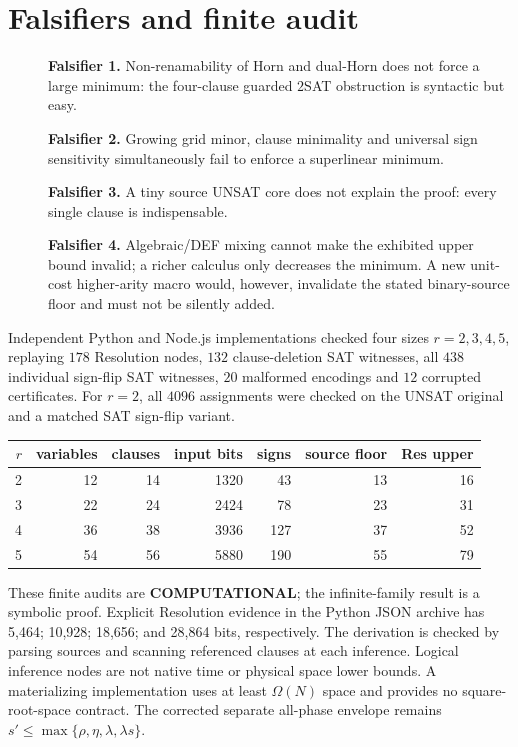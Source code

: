 \documentclass[11pt]{article}
\begin{document}
\section*{Falsifiers and finite audit}
\begin{description}
\item[] \textbf{Falsifier 1.} Non-renamability of Horn and dual-Horn does not force a large minimum: the four-clause guarded $2$SAT obstruction is syntactic but easy.
\item[] \textbf{Falsifier 2.} Growing grid minor, clause minimality and universal sign sensitivity simultaneously fail to enforce a superlinear minimum.
\item[] \textbf{Falsifier 3.} A tiny source UNSAT core does not explain the proof: every single clause is indispensable.
\item[] \textbf{Falsifier 4.} Algebraic/DEF mixing cannot make the exhibited upper bound invalid; a richer calculus only decreases the minimum. A new unit-cost higher-arity macro would, however, invalidate the stated binary-source floor and must not be silently added.
\end{description}
Independent Python and Node.js implementations checked four sizes $r=2,3,4,5$, replaying $178$ Resolution nodes, $132$ clause-deletion SAT witnesses, all $438$ individual sign-flip SAT witnesses, $20$ malformed encodings and $12$ corrupted certificates. For $r=2$, all $4096$ assignments were checked on the UNSAT original and a matched SAT sign-flip variant.

\begin{center}
\begin{tabular}{rrrrrrr}\toprule
$r$&variables&clauses&input bits&signs&source floor&Res upper\\\midrule
2&12&14&1320&43&13&16\\
3&22&24&2424&78&23&31\\
4&36&38&3936&127&37&52\\
5&54&56&5880&190&55&79\\\bottomrule
\end{tabular}
\end{center}
These finite audits are \textbf{COMPUTATIONAL}; the infinite-family result is a symbolic proof. Explicit Resolution evidence in the Python JSON archive has 5,464; 10,928; 18,656; and 28,864 bits, respectively. The derivation is checked by parsing sources and scanning referenced clauses at each inference. Logical inference nodes are not native time or physical space lower bounds. A materializing implementation uses at least $\Omega(N)$ space and provides no square-root-space contract. The corrected separate all-phase envelope remains $s'\le\max\{\rho,\eta,\lambda,\lambda s\}$.
\end{document}
